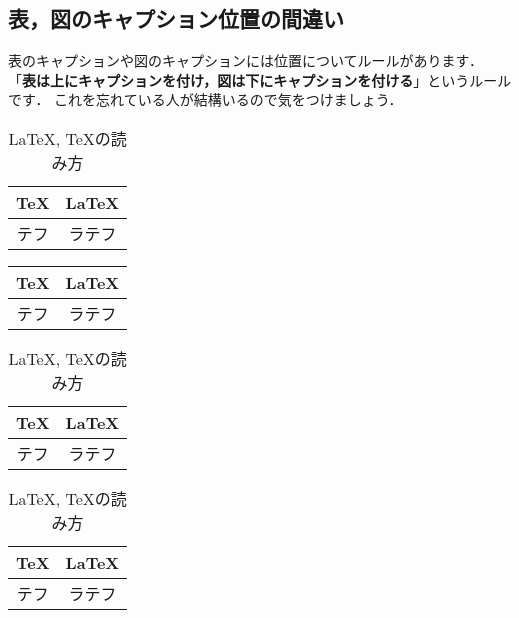 \documentclass[dvipdfmx,uplatex]{jsarticle}
\begin{document}
{\subsection{表，図のキャプション位置の間違い}
表のキャプションや図のキャプションには位置についてルールがあります．
「{\bfseries 表は上にキャプションを付け，図は下にキャプションを付ける}」というルールです．
これを忘れている人が結構いるので気をつけましょう．
\begin{tcolorbox}[title=キャプション]
  \begin{tcolorbox}[title=表のキャプションを下に付ける, colframe=wrongcolor]
    \begin{excode}
      \begin{table}[h]
        \centering
        \begin{tabular}{c|c}
          \TeX & \LaTeX \\ \hline
          テフ & ラテフ
        \end{tabular}
        \caption{\LaTeX , \TeX の読み方}
      \end{table}
    \end{excode}
  \end{tcolorbox}
  \begin{tcolorbox}[title=表のキャプションを上につける, colframe=correctcolor]
    \begin{excode}
      \caption{\LaTeX , \TeX の読み方}
      \begin{table}[h]
        \centering
        \begin{tabular}{c|c}
          \TeX & \LaTeX \\ \hline
          テフ & ラテフ
        \end{tabular}
      \end{table}
    \end{excode}
  \end{tcolorbox}
\end{tcolorbox}
\begin{table}[h]
\centering
  \begin{minipage}{0.45\columnwidth}
    \centering
    \begin{tabular}{c|c}
      \TeX & \LaTeX \\ \hline
      テフ & ラテフ
    \end{tabular}
    \caption{\LaTeX , \TeX の読み方}
  \end{minipage}
  \begin{minipage}{0.45\columnwidth}
    \centering
    \caption{\LaTeX , \TeX の読み方}
    \begin{tabular}{c|c}
      \TeX & \LaTeX \\ \hline
      テフ & ラテフ
    \end{tabular}
\end{minipage}
\end{table}

}
\end{document}
